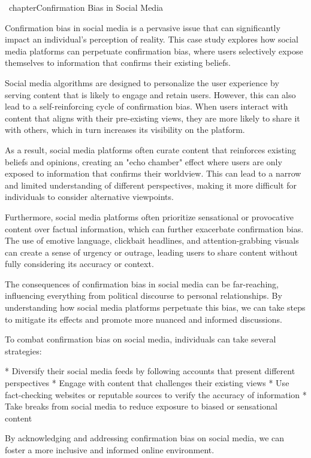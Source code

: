 \ chapter{Confirmation Bias in Social Media}

 Confirmation bias in social media is a pervasive issue that can significantly impact an individual's perception of reality. This case study explores how social media platforms can perpetuate confirmation bias, where users selectively expose themselves to information that confirms their existing beliefs.

Social media algorithms are designed to personalize the user experience by serving content that is likely to engage and retain users. However, this can also lead to a self-reinforcing cycle of confirmation bias. When users interact with content that aligns with their pre-existing views, they are more likely to share it with others, which in turn increases its visibility on the platform.

As a result, social media platforms often curate content that reinforces existing beliefs and opinions, creating an "echo chamber" effect where users are only exposed to information that confirms their worldview. This can lead to a narrow and limited understanding of different perspectives, making it more difficult for individuals to consider alternative viewpoints.

Furthermore, social media platforms often prioritize sensational or provocative content over factual information, which can further exacerbate confirmation bias. The use of emotive language, clickbait headlines, and attention-grabbing visuals can create a sense of urgency or outrage, leading users to share content without fully considering its accuracy or context.

The consequences of confirmation bias in social media can be far-reaching, influencing everything from political discourse to personal relationships. By understanding how social media platforms perpetuate this bias, we can take steps to mitigate its effects and promote more nuanced and informed discussions.

To combat confirmation bias on social media, individuals can take several strategies:

*   Diversify their social media feeds by following accounts that present different perspectives
*   Engage with content that challenges their existing views
*   Use fact-checking websites or reputable sources to verify the accuracy of information
*   Take breaks from social media to reduce exposure to biased or sensational content

By acknowledging and addressing confirmation bias on social media, we can foster a more inclusive and informed online environment.

